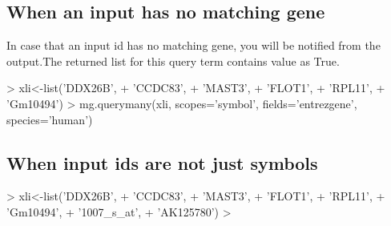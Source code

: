 \documentclass[12pt]{article}
\begin{document}
\subsection{When an input has no matching gene}

In case that an input id has no matching gene, you will be notified from the output.The returned list for this query term contains  value as True.

\begin{Schunk}
\begin{Sinput}
> xli<-list('DDX26B',
+  'CCDC83',
+  'MAST3',
+  'FLOT1',
+  'RPL11',
+  'Gm10494')
> mg.querymany(xli, scopes='symbol', fields='entrezgene', species='human')
\end{Sinput}
\end{Schunk}

\subsection{When input ids are not just symbols}

\begin{Schunk}
\begin{Sinput}
> xli<-list('DDX26B',
+  'CCDC83',
+  'MAST3',
+  'FLOT1',
+  'RPL11',
+  'Gm10494',
+  '1007_s_at',
+  'AK125780')
> 
\end{Sinput}
\end{Schunk}
\end{document}
